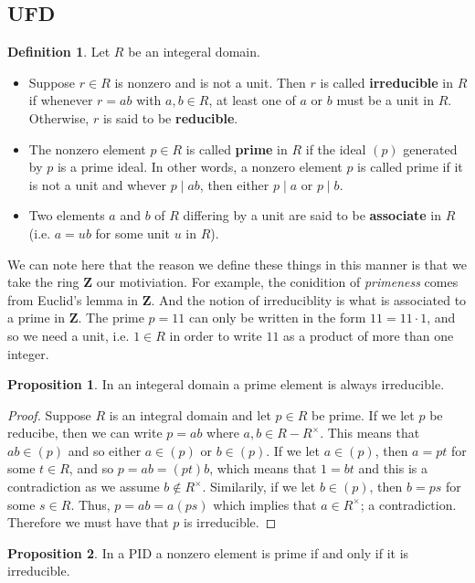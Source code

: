 \documentclass[9pt,reqno]{amsart}
\theoremstyle{definition}
\newtheorem{defi}{Definition}[section]
\newtheorem{prop}{Proposition}[section]
\newcommand{\zz}{\mathbf Z}
\begin{document}
\subsection{UFD}


\begin{defi}
Let $R$ be an integeral domain.
\begin{itemize}
	\item Suppose $r \in R$ is nonzero and is not a unit. Then $r$ is called \textbf{irreducible} in $R$ if whenever $r = ab$ with $a, b \in R$, at least one of $a$ or $b$ must be a unit in $R$. Otherwise, $r$ is said to be \textbf{reducible}. 
	\item The nonzero element $p \in R$ is called \textbf{prime} in $R$ if the ideal $(p)$ generated by $p$ is a prime ideal. In other words, a nonzero element $p$ is called prime if it is not a unit and whever $p \mid ab$, then either $p \mid a $ or $p \mid b$.
	\item Two elements $a$ and $b$ of $R$ differing by a unit are said to be \textbf{associate} in $R$ \\ (i.e. $a = ub$ for some unit $u$ in $R$). 
\end{itemize}	
\end{defi}
We can note here that the reason we define these things in this manner is that we take the ring $\zz$ our motiviation. For example, the conidition of \textit{primeness} comes from Euclid's lemma in $\zz$. And the notion of irreduciblity is what is associated to a prime in $\zz$. The prime $p = 11$ can only be written in the form $11 = 11 \cdot 1$, and so we need a unit, i.e. $1 \in R$ in order to write $11$ as a product of more than one integer. 
\begin{prop}
	In an integeral domain a prime element is always irreducible.
\end{prop}
\begin{proof}
	Suppose $R$ is an integral domain and let $p \in R$ be prime. If we let $p$ be reducibe, then we can write $p = ab$ where $a, b \in R - R^\times$. This means that $ab \in (p)$ and so either $a \in (p)$ or $b \in (p)$. If we let $a \in (p)$, then $a = pt $ for some $t \in R$, and so $p = ab = (pt ) b$, which means that $1 = bt$ and this is a contradiction as we assume $b \notin R^\times$. Similarily, if we let $b \in (p)$, then $b = ps$ for some $s \in R$. Thus, $p = ab = a (ps)$ which implies that $a \in R^\times$; a contradiction. Therefore we must have that $p$ is irreducible. 
\end{proof}
\begin{prop}
	In a PID a nonzero element is prime if and only if it is irreducible.
\end{prop}
\end{document}
